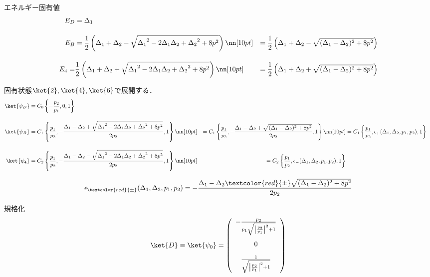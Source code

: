 エネルギー固有値
\begin{align}
    E_D&=
    {\Delta_{1}}\\[10pt]
    E_B&=
    \frac{1}{2}\left({\Delta_{1}}+{\Delta_{2}}-\sqrt{{\Delta_{1}}^2-2{\Delta_{1}}{\Delta_{2}}+{\Delta_{2}}^2+8p^2}\right)\nn[10pt]
    &=\frac{1}{2}\left({\Delta_{1}}+{\Delta_{2}}-\sqrt{{
    (\Delta_{1}}-{\Delta_{2}})^2+8p^2}\right)\\[10pt]
    E_4=&\frac{1}{2}\left({\Delta_{1}}+{\Delta_{2}}+\sqrt{{\Delta_{1}}^2-2{\Delta_{1}}{\Delta_{2}}+{\Delta_{2}}^2+8p^2}\right)
    \nn[10pt]
    &=\frac{1}{2}\left({\Delta_{1}}+{\Delta_{2}}
    +\sqrt{{
    (\Delta_{1}}-{\Delta_{2}})^2+8p^2}\right)
    \end{align}


固有状態$\ket{2}, \ket{4}, \ket{6}$で展開する．
\begin{align}
    \ket{\psi_D}&=C_0\left\{-\frac{{p_{2}}}{{p_{1}}},0,1\right\}\\[10pt]
    \ket{\psi_B}&=C_1\left\{\frac{{p_{1}}}{{p_{2}}},-\frac{{\Delta_{1}}-{\Delta_{2}}+\sqrt{{\Delta_{1}}^2-2{\Delta_{1}}{\Delta_{2}}+{\Delta_{2}}^2+8p^2}}{2{p_{2}}},1\right\}\nn[10pt]
    &=C_1\left\{\frac{{p_{1}}}{{p_{2}}},-\frac{{\Delta_{1}}-{\Delta_{2}}
    +\sqrt{({\Delta_{1}}-{\Delta_{2}})^2+8p^2}}{2{p_{2}}},1\right\}\nn[10pt]
    &=C_1\left\{\frac{{p_{1}}}{{p_{2}}},
    \epsilon_+({\Delta_{1}},{\Delta_{2}},
    p_1,p_2)
    ,1\right\}\\[10pt]
    \ket{\psi_4}&=C_2\left\{\frac{{p_{1}}}{{p_{2}}},-\frac{{\Delta_{1}}-{\Delta_{2}}-\sqrt{{\Delta_{1}}^2-2{\Delta_{1}}{\Delta_{2}}+{\Delta_{2}}^2+8p^2}}{2{p_{2}}},1\right\}\nn[10pt]
    &=C_2\left\{\frac{{p_{1}}}{{p_{2}}},
    \epsilon_-({\Delta_{1}},{\Delta_{2}},
    p_1,p_2)
    ,1\right\}
\end{align}

\begin{align}
    \epsilon_{\textcolor{red}{\pm}}({\Delta_{1}},{\Delta_{2}},
    p_1,p_2)
    =-\frac{{\Delta_{1}}-{\Delta_{2}}
    \textcolor{red}{\pm}\sqrt{({\Delta_{1}}-{\Delta_{2}})^2+8p^2}}{2{p_{2}}}
\end{align}


規格化
\begin{equation}
        \ket{D}\equiv\ket{\psi_0}=\left(
        \begin{array}{c}
       -\frac{{p_2}}{{p_1}\sqrt{\left|\frac{{p_2}}{{p_1}}\right|^2+1}}\\[20pt]
       0\\[10pt]
       \frac{1}{\sqrt{\left|\frac{{p_2}}{{p_1}}\right|^2+1}}\\[10pt]
        \end{array}
        \right)
\end{equation}

